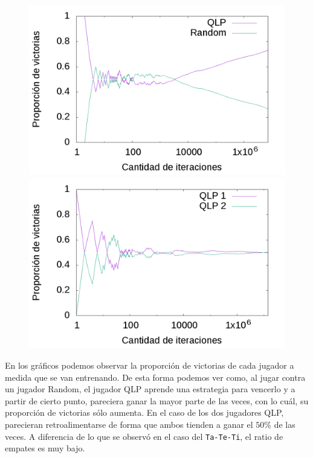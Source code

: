 \documentclass[10pt, a4paper]{article}
\begin{document}
\begin{figure}[H]
  \begin{minipage}[c]{1\textwidth}
	\includegraphics[scale=0.25]{Initial/QvR.png}
	\includegraphics[scale=0.25]{Initial/QvQ.png}
  \end{minipage}
\end{figure}

En los gráficos podemos observar la proporción de victorias de cada jugador a medida que se van entrenando. De esta forma podemos ver como, al jugar contra un jugador Random, el jugador QLP aprende una estrategia para vencerlo y a partir de cierto punto, pareciera ganar la mayor parte de las veces, con lo cuál, su proporción de victorias sólo aumenta. En el caso de los dos jugadores QLP, parecieran retroalimentarse de forma que ambos tienden a ganar el $50\%$ de las veces. A diferencia de lo que se observó en el caso del \texttt{Ta-Te-Ti}, el ratio de empates es muy bajo.
\end{document}
